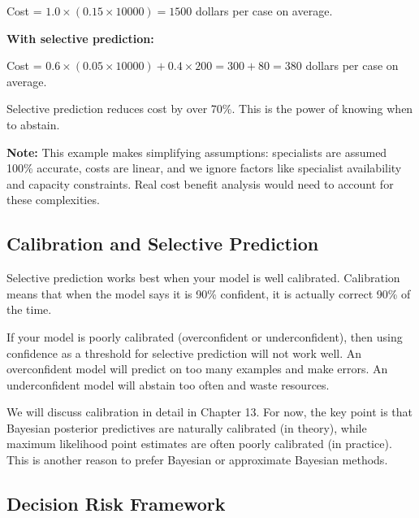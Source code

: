 \begin{examplebox}
Cost = $1.0 \times (0.15 \times 10000) = 1500$ dollars per case on average.

\vspace{0.5em}

\textbf{With selective prediction:}

Cost = $0.6 \times (0.05 \times 10000) + 0.4 \times 200 = 300 + 80 = 380$ dollars per case on average.

\vspace{0.5em}

Selective prediction reduces cost by over 70\%. This is the power of knowing when to abstain.

\vspace{0.5em}

\textbf{Note:} This example makes simplifying assumptions: specialists are assumed 100\% accurate, costs are linear, and we ignore factors like specialist availability and capacity constraints. Real cost benefit analysis would need to account for these complexities.
\end{examplebox}

\vspace{1.5em}

\subsection{Calibration and Selective Prediction}

Selective prediction works best when your model is well calibrated. Calibration means that when the model says it is 90\% confident, it is actually correct 90\% of the time.

If your model is poorly calibrated (overconfident or underconfident), then using confidence as a threshold for selective prediction will not work well. An overconfident model will predict on too many examples and make errors. An underconfident model will abstain too often and waste resources.

We will discuss calibration in detail in Chapter 13. For now, the key point is that Bayesian posterior predictives are naturally calibrated (in theory), while maximum likelihood point estimates are often poorly calibrated (in practice). This is another reason to prefer Bayesian or approximate Bayesian methods.

\subsection{Decision Risk Framework}


